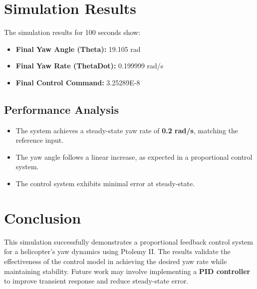 \documentclass{article}
\begin{document}
\section{Simulation Results}
The simulation results for 100 seconds show:
\begin{itemize}
    \item \textbf{Final Yaw Angle (Theta):} 19.105 rad
    \item \textbf{Final Yaw Rate (ThetaDot):} 0.199999 rad/s
    \item \textbf{Final Control Command:} 3.25289E-8
\end{itemize}

\subsection{Performance Analysis}
\begin{itemize}
    \item The system achieves a steady-state yaw rate of \textbf{0.2 rad/s}, matching the reference input.
    \item The yaw angle follows a linear increase, as expected in a proportional control system.
    \item The control system exhibits minimal error at steady-state.
\end{itemize}

\section{Conclusion}
This simulation successfully demonstrates a proportional feedback control system for a helicopter's yaw dynamics using Ptolemy II. The results validate the effectiveness of the control model in achieving the desired yaw rate while maintaining stability. Future work may involve implementing a \textbf{PID controller} to improve transient response and reduce steady-state error.
\end{document}
